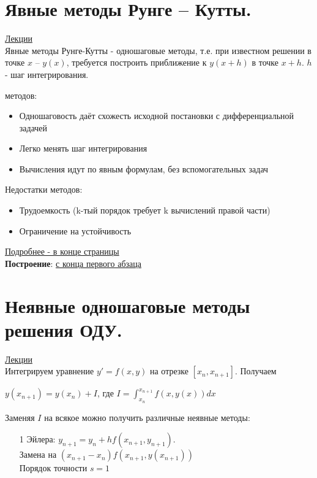 \documentclass[specialist, subf, href, colorlinks=true, 12pt, times, mtpro, final]{disser}
\theoremstyle{definition}
\begin{document}
{\section {Явные методы Рунге -- Кутты.}
    \hyperlink {lects.89}{Лекции}\\
    
    Явные методы Рунге-Кутты - одношаговые методы, т.е. при известном решении в точке $x$ \--- $y(x)$, требуется построить приближение к $y(x+h)$ в точке $x+h$. $h$ - шаг интегрирования.
    
     методов:
    \begin{itemize}
    \item Одношаговость даёт схожесть исходной постановки с дифференциальной задачей
    \item Легко менять шаг интегрирования
    \item Вычисления идут по явным формулам, без вспомогательных задач
    \end{itemize}
    Недостатки методов:
    \begin{itemize}
    \item Трудоемкость (k-тый порядок требует k вычислений правой части)
    \item Ограничение на устойчивость 
    \end{itemize}
    \hyperlink {lects.90}{Подробнее - в конце страницы}\\

    \noindent\textbf{Построение}: \hyperlink {lects.89}{с конца первого абзаца}\\

\section {Неявные одношаговые методы решения ОДУ.}
    \hyperlink {lects.91}{Лекции}\\
    Интегрируем уравнение $y' = f (x,y)$ на отрезке $[x_n, x_{n+1}]$. Получаем
    \begin{center}
    $y(x_{n+1}) = y (x_n) + I$, где $I = \int^{x_{n+1}}_{x_n} f(x,y(x))dx$
    \end{center}
    Заменяя $I$ на всякое можно получить различные неявные методы:
    \begin{itemize}
    \item[1] Эйлера: $y_{n+1} = y_n + hf(x_{n+1}, y_{n+1})$. \\
    Замена на $(x_{n+1}-x_n)f(x_{n+1}, y(x_{n+1}))$\\
    Порядок точности $s=1$\\
    

\end{itemize}}
\end{document}
